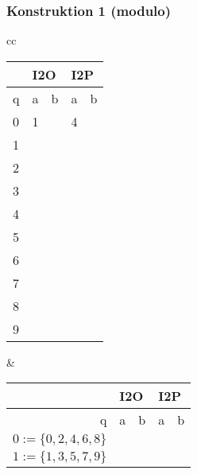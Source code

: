 \begin{frame}
  \frametitle{Konstruktion 1 (modulo)}
  \centering
  \begin{tabular}{cc}
    \begin{tabular}{|l|l|l|l|l|}
      \hline
      & \multicolumn{2}{l|}{I2O} & \multicolumn{2}{l|}{I2P} \\\hline
    q & a           & b          & a           & b          \\\hline\hline
    \cellcolor[HTML]{DAE8FC}0  &  1           &            & 4            &            \\\hline
    1 &             &            &             &            \\\hline
    \cellcolor[HTML]{DAE8FC}2 &             &            &             &            \\\hline
    3 &             &            &             &            \\\hline
    \cellcolor[HTML]{DAE8FC}4 &             &            &             &            \\\hline
    5 &             &            &             &            \\\hline
    \cellcolor[HTML]{DAE8FC}6 &             &            &             &            \\\hline
    7 &             &            &             &            \\\hline
    \cellcolor[HTML]{DAE8FC}8 &             &            &             &            \\\hline
    9 &             &            &             &           \\\hline
    \end{tabular}
    &
    \begin{tabular}{|r|r|r|r|r|}
      \hline
      & \multicolumn{2}{l|}{I2O} & \multicolumn{2}{l|}{I2P} \\\hline
    q & a           & b          & a           & b          \\\hline\hline
    \cellcolor[HTML]{DAE8FC}$0:=\{0,2,4,6,8\}$  &             &            &             &            \\\hline
    $1:=\{1,3,5,7,9\}$ &             &            &             &            \\\hline
    \end{tabular}
    \end{tabular}
\end{frame}

